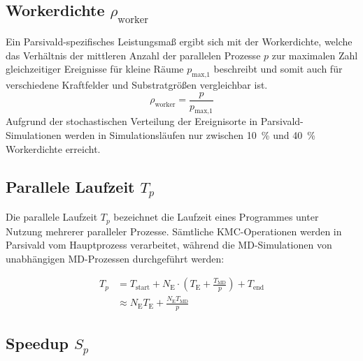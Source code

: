 \subsection{Workerdichte $\rho_\text{worker}$}

Ein Parsivald-spezifisches Leistungsmaß ergibt sich mit der Workerdichte, welche das Verhältnis der mittleren Anzahl der parallelen Prozesse $p$ zur maximalen Zahl gleichzeitiger Ereignisse für kleine Räume $p_\text{max,1}$ beschreibt und somit auch für verschiedene Kraftfelder und Substratgrößen vergleichbar ist.
\begin{equation}
  \rho_\text{worker} = \frac{p}{p_\text{max,1}}
\end{equation}
Aufgrund der stochastischen Verteilung der Ereignisorte in Parsivald-Simulationen werden in Simulationsläufen nur zwischen \SI{10}{\percent} und \SI{40}{\percent} Workerdichte erreicht.

\subsection{Parallele Laufzeit $T_p$}

Die parallele Laufzeit $T_p$ bezeichnet die Laufzeit eines Programmes unter Nutzung mehrerer paralleler Prozesse.
Sämtliche KMC-Operationen werden in Parsivald vom Hauptprozess verarbeitet, während die MD-Simulationen von unabhängigen MD-Prozessen durchgeführt werden:

\begin{align}
  T_p & = T_\text{start} + N_\text{E} \cdot (T_\text{E} + \frac{T_\text{MD}}{p}) + T_\text{end} \\
      & \approx N_\text{E} T_\text{E} + \frac{N_\text{E} T_\text{MD}}{p}
\end{align}

\subsection{Speedup $S_p$}

